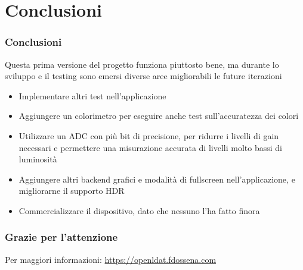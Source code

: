 \documentclass[xcolor={dvipsnames}]{beamer}
\begin{document}
\section{Conclusioni}
\begin{frame}
	\frametitle{Conclusioni}
	Questa prima versione del progetto funziona piuttosto bene, ma durante lo sviluppo e il testing sono emersi diverse aree migliorabili le future iterazioni
	\begin{itemize}
		\item Implementare \alert{altri test} nell'applicazione
		\item Aggiungere un \alert{colorimetro} per eseguire anche test sull'accuratezza dei colori
		\item Utilizzare un \alert{ADC con più bit} di precisione, per ridurre i livelli di gain necessari e permettere una misurazione accurata di livelli molto bassi di luminosità
		\item Aggiungere \alert{altri backend grafici e modalità di fullscreen} nell'applicazione, e \alert{migliorarne il supporto HDR}
		\item \alert{Commercializzare il dispositivo}, dato che nessuno l'ha fatto finora
	\end{itemize}
\end{frame}
\begin{frame}
	\frametitle{Grazie per l'attenzione}
	\centering
	Per maggiori informazioni:
	\alert{\url{https://openldat.fdossena.com}}
\end{frame}
\end{document}
